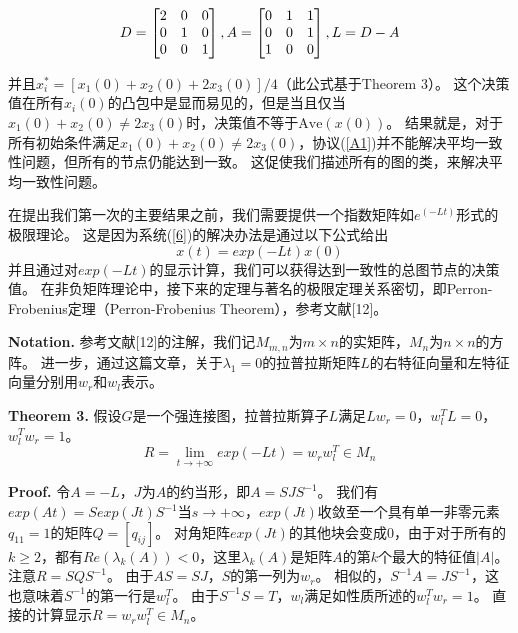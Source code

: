 \documentclass{article}
\begin{document}
{\color{blue}
\begin{equation}
    D = \left[
    \begin{matrix}
        2 & 0 & 0 \\
        0 & 1 & 0 \\
        0 & 0 & 1 
    \end{matrix}
    \right],
    A = \left[
    \begin{matrix}
        0 & 1 & 1 \\
        0 & 0 & 1 \\
        1 & 0 & 0 
    \end{matrix}
    \right],
    L = D - A
    \notag
\end{equation}
}

并且$x^*_i = [x_1(0) + x_2(0) + 2x_3(0)]/4$（此公式基于Theorem 3）。
这个决策值在所有$x_i(0)$的凸包中是显而易见的，但是当且仅当$x_1(0) + x_2(0) \ne 2x_3(0)$时，决策值不等于$\text{Ave}(x(0))$。
结果就是，对于所有初始条件满足$x_1(0) + x_2(0) \ne 2x_3(0)$，协议(\ref{A1})并不能解决平均一致性问题，但所有的节点仍能达到一致。
这促使我们描述所有的图的类，来解决平均一致性问题。

在提出我们第一次的主要结果之前，我们需要提供一个指数矩阵如$e^{(-Lt)}$形式的极限理论。
这是因为系统(\ref{6})的解决办法是通过以下公式给出
\begin{equation}
    x(t) = exp(-Lt)x(0)
    \tag{17}
    \label{17}
\end{equation}
并且通过对$exp(-Lt)$的显示计算，我们可以获得达到一致性的总图节点的决策值。
在非负矩阵理论中，接下来的定理与著名的极限定理关系密切，即Perron-Frobenius定理（Perron-Frobenius Theorem），参考文献[12]。

\noindent \textbf{Notation.} 参考文献[12]的注解，我们记$M_{m,n}$为$m\times n$的实矩阵，$M_n$为$n \times n$的方阵。
进一步，通过这篇文章，关于$\lambda_1 = 0$的拉普拉斯矩阵$L$的右特征向量和左特征向量分别用$w_r$和$w_l$表示。

\noindent \textbf{Theorem 3.} 假设$G$是一个强连接图，拉普拉斯算子$L$满足$Lw_r=0$，$w_l^TL = 0$，$w_l^Tw_r=1$。
\begin{equation}
    R = \lim_{t\rightarrow +\infty} exp(-Lt) = w_r w_l^T \in M_n
    \tag{18}
    \label{18}
\end{equation}

\noindent \textbf{Proof.} 令$A=-L$，$J$为$A$的约当形，即$A=SJS^{-1}$。
我们有$exp(At) = S exp(Jt) S^{-1}$当$s\rightarrow +\infty$，$exp(Jt)$收敛至一个具有单一非零元素$q_{11}=1$的矩阵$Q=[q_{ij}]$。
对角矩阵$exp(Jt)$的其他块会变成0，由于对于所有的$k\ge2$，都有$Re(\lambda_k(A))<0$，这里$\lambda_k(A)$是矩阵$A$的第$k$个最大的特征值$|A|$。
注意$R=SQS^{-1}$。
由于$AS=SJ$，$S$的第一列为$w_r$。
相似的，$S^{-1}A = JS^{-1}$，这也意味着$S^{-1}$的第一行是$w_l^T$。
由于$S^{-1}S=T$，$w_l$满足如性质所述的$w_l^Tw_r=1$。
直接的计算显示$R=w_rw_l^T\in M_n$。
\end{document}
